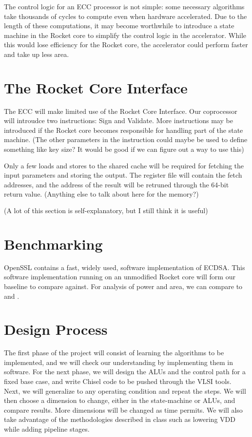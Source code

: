 \documentclass[twocolumn]{article}
\begin{document}
The control logic for an ECC processor is not simple: some necessary
algorithms take thousands of cycles\cite{mmm-hw_ecc} to compute even
when hardware accelerated.  Due to the length of these computations,
it may become worthwhile to introduce a state machine in the Rocket core
to simplify the control logic in the accelerator. While this would lose
efficiency for the Rocket core, the accelerator could perform faster
and take up less area. 

\section{The Rocket Core Interface}

The ECC will make limited use of the Rocket Core Interface. Our 
coprocessor will introudce two instructions: Sign and Validate. More
instructions may be introduced if the Rocket core becomes responsible
for handling part of the state machine. (The other 
parameters in the instruction could maybe be used to define something
like key size? It would be good if we can figure out a way to use this) 

Only a few loads and stores to the shared cache will be required for 
fetching the input parameters and storing the output. The register file
will contain the fetch addresses, and the address of the result will be
retruned through the 64-bit return value. (Anything else to talk about 
here for the memory?) 

(A lot of this section is self-explanatory, but I still think it is useful)

\section{Benchmarking}

OpenSSL contains a fast, widely used, software implementation of
ECDSA\cite{kasper-openssl_ecc}.  This software implementation running
on an unmodified Rocket core will form our baseline to compare
against. For analysis of power and area, we can compare to \cite{mmm-hw_ecc} 
and \cite{nnll-ecdsa_hw}. 

\section{Design Process}

The first phase of the project will consist of learning the algorithms to be 
implemented, and we will check our understanding by implementing them in software.
For the next phase, we will design the ALUs and the control path for a fixed base case,
and write Chisel code to be pushed through the VLSI tools. Next, we will generalize
to any operating condition and repeat the steps. We will then choose a dimension to 
change, either in the state-machine or ALUs, and compare results. More dimensions
will be changed as time permits. We will also take advantage of the methodologies
described in class such as lowering VDD while adding pipeline stages.  



\end{document}
